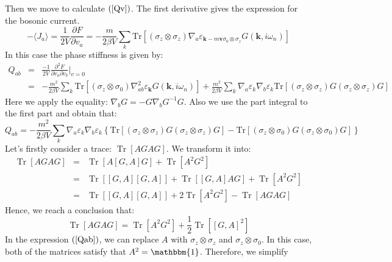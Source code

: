 \documentclass{article}
\newcommand{\nobracket}{}
\newcommand{\tmmathbf}[1]{\ensuremath{\boldsymbol{#1}}}
\newcommand{\tmop}[1]{\ensuremath{\operatorname{#1}}}
\begin{document}
Then we move to calculate $\left( \ref{Qv} \right)$. The first derivative
gives the expression for the bosonic current.
\begin{equation}
  - \langle J_a \rangle = \frac{1}{2 V} \frac{\partial F}{\partial v_a} = -
  \frac{m}{2 \beta V} \sum_k \text{Tr} [(\sigma_z \otimes \sigma_z) \nabla_a
  \varepsilon_{\tmmathbf{k}- m\tmmathbf{v} \sigma_0 \otimes \sigma_z} G
  (\tmmathbf{k}, i \omega_n)]
\end{equation}
In this case the phase stiffness is given by:
\begin{eqnarray}
  Q_{a b} & = & \frac{- 1}{2 V} \frac{\partial^2 F}{\partial v_a \partial v_b}
  |_{v = 0} \nobracket \nonumber\\
  & = & - \frac{m^2}{2 \beta V} \sum_k \text{Tr} [(\sigma_z \otimes \sigma_0)
  \nabla_{a b}^2 \varepsilon_{\tmmathbf{k}} G (\tmmathbf{k}, i \omega_n)] +
  \frac{m^2}{2 \beta V} \sum_k \nabla_a \varepsilon_k \nabla_b \varepsilon_k
  \text{Tr} [(\sigma_z \otimes \sigma_z) G (\sigma_z \otimes \sigma_z) G] 
\end{eqnarray}
Here we apply the equality: $\nabla_b G = - G  \nabla_b G^{- 1} G$. Also we
use the part integral to the first part and obtain that:
\begin{equation}
  Q_{a b} = - \frac{m^2}{2 \beta V} \sum_k \nabla_a \varepsilon_k \nabla_b
  \varepsilon_k \left\{ \text{Tr} [(\sigma_z \otimes \sigma_z) G (\sigma_z
  \otimes \sigma_z) G] - \text{Tr} [(\sigma_z \otimes \sigma_0) G (\sigma_z
  \otimes \sigma_0) G] \right\} \label{Qab}
\end{equation}
Let's firstly consider a trace: $\tmop{Tr} [A G A G]$. We transform it into:
\begin{eqnarray}
  \tmop{Tr} [A G A G] & = & \tmop{Tr} [A [G, A] G] + \tmop{Tr} [A^2 G^2]
  \nonumber\\
  & = & \tmop{Tr} [[G, A] [G, A]] + \tmop{Tr} [[G, A] A G] + \tmop{Tr} [A^2
  G^2] \nonumber\\
  & = & \tmop{Tr} [[G, A] [G, A]] + 2 \tmop{Tr} [A^2 G^2] - \tmop{Tr} [A G A
  G] 
\end{eqnarray}
Hence, we reach a conclusion that:
\begin{equation}
  \tmop{Tr} [A G A G] = \tmop{Tr} [A^2 G^2] + \frac{1}{2} \tmop{Tr} [[G, A]^2]
\end{equation}
In the expression $\left( \ref{Qab} \right)$, we can replace $A$ with
$\sigma_z \otimes \sigma_z$ and $\sigma_z \otimes \sigma_0$. In this case,
both of the matrices satisfy that $A^2 =\mathbbm{1}$. Therefore, we simplify
\end{document}
